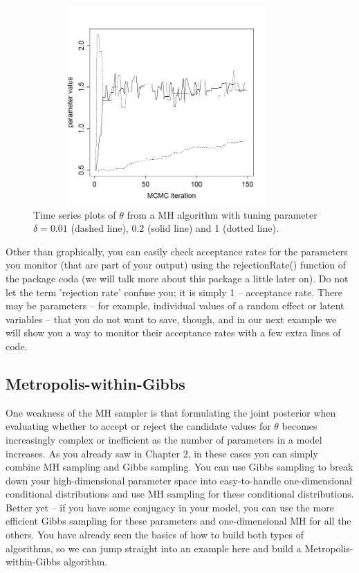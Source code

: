  \begin{figure}
\begin{center}
\includegraphics[height=3in,width=4in]{Ch7/figs/tuning}
\end{center}
\caption{Time series plots of $\theta$ from a MH algorithm with tuning parameter  $\delta = 0.01$ (dashed line), 0.2 (solid line) and  1 (dotted line).}
\label{mcmc.fig.tuning}
\end{figure}

Other than graphically, you can easily check acceptance rates for the parameters you monitor (that are part of your output) using the rejectionRate() function of the package coda (we will talk more about this package a little later on). Do not let the term 'rejection rate' confuse you; it is simply 1 -- acceptance rate. There may be parameters – for example, individual values of a random effect or latent variables – that you do not want to save, though, and in our next example we will show you a way to monitor their acceptance rates with a few extra lines of code.



\subsection{ Metropolis-within-Gibbs }

One weakness of the MH sampler is that formulating the joint posterior when evaluating whether to accept or reject the candidate values for $\theta$ becomes increasingly complex or inefficient as the number of parameters in a model increases. As you already saw in Chapter 2, in these cases you can simply combine MH sampling and Gibbs sampling. You can use Gibbs sampling to break down your high-dimensional parameter space into easy-to-handle one-dimensional conditional distributions and use MH sampling for these conditional distributions. Better yet – if you have some conjugacy in your model, you can use the more efficient Gibbs sampling for these parameters and one-dimensional MH for all the others. You have already seen the basics of how to build both types of algorithms, so we can jump straight into an example here and build a Metropolis-within-Gibbs algorithm.

